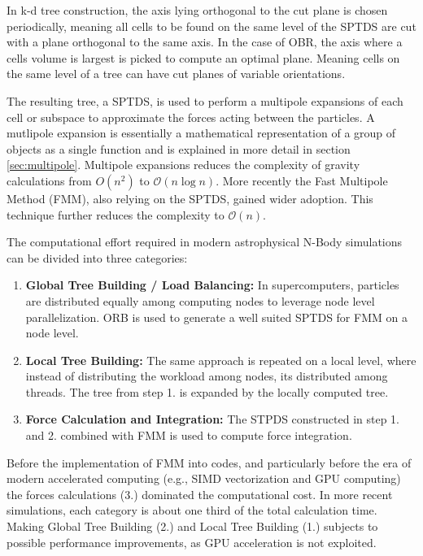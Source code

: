 \documentclass[]{article}
\begin{document}
In k-d tree construction, the axis lying orthogonal to the cut plane is chosen periodically, meaning all cells to be found on the same level of the SPTDS are cut with a plane orthogonal to the same axis. In the case of OBR, the axis where a cells volume is largest is picked to compute an optimal plane. Meaning cells on the same level of a tree can have cut planes of variable orientations. 

The resulting tree, a SPTDS, is used to perform a multipole expansions of each cell or subspace to approximate the forces acting between the particles. A mutlipole expansion is essentially a mathematical representation of a group of objects as a single function and is explained in more detail in section \ref{sec:multipole}.
Multipole expansions reduces the complexity of gravity calculations from $O(n^2)$ to $\mathcal{O}(n\log{}n)$. More recently the Fast Multipole Method (FMM), also relying on the SPTDS, gained wider adoption. This technique further reduces the complexity to $\mathcal{O}(n)$. 

The computational effort required in modern astrophysical N-Body simulations can be divided into three categories:

\begin{enumerate}
	\item \textbf{Global Tree Building / Load Balancing:} In supercomputers, particles are distributed equally among computing nodes to leverage node level parallelization. ORB is used to generate a well suited SPTDS for FMM on a node level.
	\item \textbf{Local Tree Building:} The same approach is repeated on a local level, where instead of distributing the workload among nodes, its distributed among threads. The tree from step 1. is expanded by the locally computed tree.
	\item \textbf{Force Calculation and Integration:} The STPDS constructed in step 1. and 2. combined with FMM is used to compute force integration. 
\end{enumerate}

Before the implementation of FMM into codes, and particularly before the era of modern accelerated computing (e.g., SIMD vectorization and GPU computing) the forces calculations (3.) dominated the computational cost. In more recent simulations, each category is about one third of the total calculation time\cite{Stadel2001}. Making Global Tree Building (2.) and Local Tree Building (1.) subjects to possible performance improvements, as GPU acceleration is not exploited. 
\end{document}
